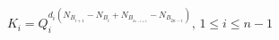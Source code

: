 \begin{equation}
K_i=Q_i^{d_i(N_{B_{i+1}}-N_{B_i}+N_{B_{_{2n-i+1}}}-N_{B_{2n-i}})},\, %
1\leq i\leq n-1
\end{equation}

